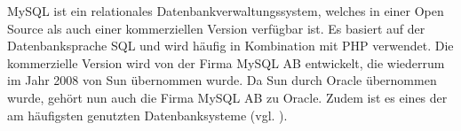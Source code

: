 MySQL ist ein relationales Datenbankverwaltungssystem, welches in einer Open Source als auch einer kommerziellen Version verfügbar ist. Es basiert auf der Datenbanksprache \ac{SQL} und wird häufig in Kombination mit \ac{PHP} verwendet. Die kommerzielle Version wird von der Firma MySQL AB entwickelt, die wiederrum im Jahr 2008 von Sun übernommen wurde. Da Sun durch Oracle übernommen wurde, gehört nun auch die Firma MySQL AB zu Oracle.  Zudem ist es eines der am häufigsten genutzten Datenbanksysteme (vgl. \cite{.q}\cite{Horn.12.03.2017}).